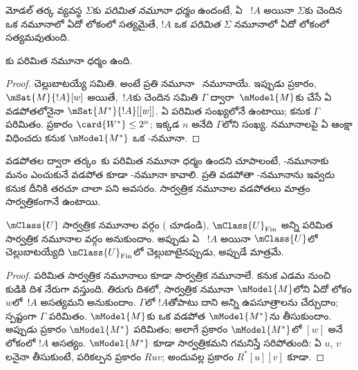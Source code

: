 \documentclass[../../../include/open-logic-section]{subfiles}
\begin{document}


\begin{defn}
  మోడల్ తర్క వ్యవస్థ $\Sigma$కు \emph{పరిమిత నమూనా ధర్మం}
  ఉందంటే, ఏ ~$!A$
  అయినా $\Sigma$కు చెందిన ఒక నమూనాలో ఏదో లోకంలో సత్యమైతే,
  $!A$ ఒక \emph{పరిమిత} $\Sigma$ నమూనాలో
  ఏదో లోకంలో సత్యమవుతుంది.
\end{defn}

\begin{prop}
  కు పరిమిత నమూనా ధర్మం ఉంది.
\end{prop}

\begin{proof}
   చెల్లుబాటయ్యే
   సమితి. అంటే ప్రతి
  నమూనా~ నమూనాయే. ఇప్పుడు
   ప్రకారం,
  $\mSat{M}{!A}[w]$ అయితే,~$!A$కు చెందిన
   సమితి $\Gamma$
  ద్వారా~$\mModel{M}$కు చేసే ఏ వడపోతలోనైనా
  $\mSat{M^*}{!A}[{[w]}]$.
  ఏ  పరిమిత
  సంఖ్యలోనే 
  ఉంటాయి; కనుక $\Gamma$ పరిమితం.
   ప్రకారం
  $\card{W^*} \le 2^n$; ఇక్కడ $n$ అనేది
  $\Gamma$లోని  సంఖ్య.
   నమూనాలపై ఏ ఆంక్షా విధించదు కనుక
  $\mModel{M^*}$ ఒక -నమూనా.
\end{proof}

వడపోతల ద్వారా తర్కం~కు పరిమిత నమూనా
ధర్మం ఉందని చూపాలంటే, -నమూనాకు మనం ఎంచుకునే
వడపోత కూడా -నమూనా కావాలి. ప్రతి వడపోతా
-నమూనాను ఇవ్వదు కనుక దీనికి తరచూ చాలా పని అవసరం.
సార్వత్రిక నమూనాల వడపోతలు మాత్రం సార్వత్రికంగానే ఉంటాయి.

\begin{prop}
  $\mClass{U}$ సార్వత్రిక నమూనాల వర్గం
  ( చూడండి),
  $\mClass{U}_\mathrm{Fin}$ అన్ని పరిమిత సార్వత్రిక
  నమూనాల వర్గం అనుకుందాం. అప్పుడు ఏ
  ~$!A$ అయినా
  $\mClass{U}$లో చెల్లుబాటయ్యేది
  $\mClass{U}_\mathrm{Fin}$లో చెల్లుబాటైనప్పుడు, అప్పుడే మాత్రమే.
\end{prop}

\begin{proof}
  పరిమిత సార్వత్రిక నమూనాలు కూడా సార్వత్రిక నమూనాలే.
  కనుక ఎడమ నుంచి కుడికి దిశ నేరుగా వస్తుంది.
  తిరుగు దిశలో, సార్వత్రిక నమూనా
  $\mModel{M}$లోని ఏదో లోకం $w$లో~$!A$
  అసత్యమని అనుకుందాం. $\Gamma$లో $!A$తోపాటు
  దాని అన్ని ఉపసూత్రాలను చేర్చుదాం; స్పష్టంగా
  $\Gamma$ పరిమితం. $\mModel{M}$కు ఒక వడపోత
  $\mModel{M^*}$ను తీసుకుందాం. అప్పుడు
   ప్రకారం
  $\mModel{M^*}$ పరిమితం; అలాగే
   ప్రకారం
  $\mModel{M^*}$లో $[w]$ అనే లోకంలో $!A$ అసత్యం.
  $\mModel{M^*}$ కూడా సార్వత్రికమని గమనిస్తే
  సరిపోతుంది: ఏ $u$, $v$లనైనా తీసుకుంటే,
  పరికల్పన ప్రకారం $Ruv$; అందువల్ల
  ప్రకారం $R^*[u][v]$ కూడా.
\end{proof}
\end{document}
